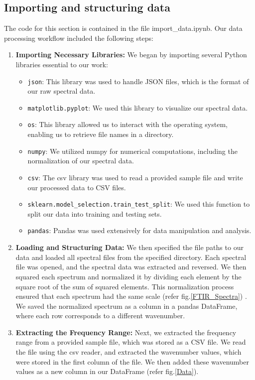 \documentclass{cernatsnote}
\begin{document}
\subsection{Importing and structuring data}

The code for this section is contained in the file import\_data.ipynb. Our data processing workflow included the following steps:

\begin{enumerate}

\item \textbf{Importing Necessary Libraries:}
We began by importing several Python libraries essential to our work:

\begin{itemize}
\item \texttt{json}: This library was used to handle JSON files, which is the format of our raw spectral data.
\item \texttt{matplotlib.pyplot}: We used this library to visualize our spectral data.
\item \texttt{os}: This library allowed us to interact with the operating system, enabling us to retrieve file names in a directory.
\item \texttt{numpy}: We utilized numpy for numerical computations, including the normalization of our spectral data.
\item \texttt{csv}: The csv library was used to read a provided sample file and write our processed data to CSV files.
\item \texttt{sklearn.model\_selection.train\_test\_split}: We used this function to split our data into training and testing sets.
\item \texttt{pandas}: Pandas was used extensively for data manipulation and analysis.
\end{itemize}

\item \textbf{Loading and Structuring Data:}
We then specified the file paths to our data and loaded all spectral files from the specified directory. Each spectral file was opened, and the spectral data was extracted and reversed. We then squared each spectrum and normalized it by dividing each element by the square root of the sum of squared elements. This normalization process ensured that each spectrum had the same scale (refer fig.\ref{FTIR_Spectra}) . We saved the normalized spectrum as a column in a pandas DataFrame, where each row corresponds to a different wavenumber. 

\item \textbf{Extracting the Frequency Range:}
Next, we extracted the frequency range from a provided sample file, which was stored as a CSV file. We read the file using the csv reader, and extracted the wavenumber values, which were stored in the first column of the file. We then added these wavenumber values as a new column in our DataFrame (refer fig.\ref{Data}).


\end{enumerate}
\end{document}
